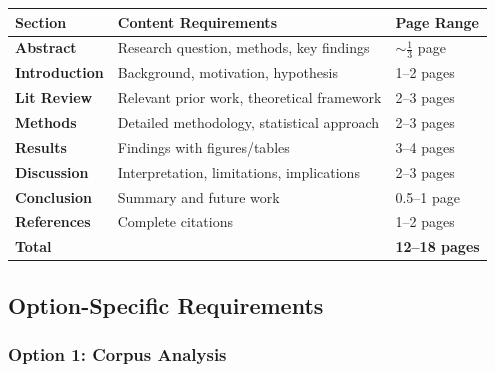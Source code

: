 \documentclass[10pt,letterpaper]{article}
\begin{document}
\begin{center}
\small
\renewcommand{\arraystretch}{1.18}
\begin{tabularx}{0.98\textwidth}{>{\bfseries}p{2.4cm}Xp{2.2cm}}
\toprule
\rowcolor{accentblue!10}
Section & Content Requirements & Page Range\\
\midrule
Abstract & Research question, methods, key findings & $\sim\frac{1}{3}$ page\\
Introduction & Background, motivation, hypothesis & 1--2 pages\\
Lit Review & Relevant prior work, theoretical framework & 2--3 pages\\
Methods & Detailed methodology, statistical approach & 2--3 pages\\
Results & Findings with figures/tables & 3--4 pages\\
Discussion & Interpretation, limitations, implications & 2--3 pages\\
Conclusion & Summary and future work & 0.5--1 page\\
References & Complete citations & 1--2 pages\\
\midrule
Total & & \textbf{12--18 pages}\\
\bottomrule
\end{tabularx}
\end{center}

\subsection{Option-Specific Requirements}

\subsubsection{Option 1: Corpus Analysis}
\end{document}

